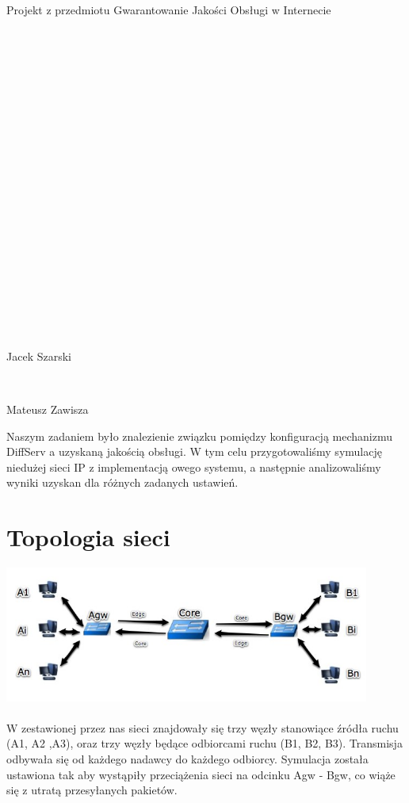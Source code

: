 \documentclass[a4paper]{article}
\begin{document}


{\large Projekt z przedmiotu Gwarantowanie Jakości Obsługi w Internecie}

\

\

\

\

\

\

\

\

\

\

\

\

Jacek Szarski

\

Mateusz Zawisza

\pagebreak

Naszym zadaniem było znalezienie związku pomiędzy konfiguracją mechanizmu DiffServ a uzyskaną jakością obsługi. W tym celu przygotowaliśmy symulację niedużej sieci IP z implementacją owego systemu, a następnie analizowaliśmy wyniki uzyskan dla różnych zadanych ustawień.


\section{Topologia sieci}

\includegraphics[width=120mm]{images/topologia.jpeg}

\paragraph{}
W zestawionej przez nas sieci znajdowały się trzy węzły stanowiące źródła ruchu (A1, A2 ,A3), oraz trzy węzły będące odbiorcami ruchu (B1, B2, B3). Transmisja odbywała się od każdego nadawcy do każdego odbiorcy. Symulacja została ustawiona tak aby wystąpiły przeciążenia sieci na odcinku Agw - Bgw, co wiąże się z utratą przesyłanych pakietów.
\end{document}
